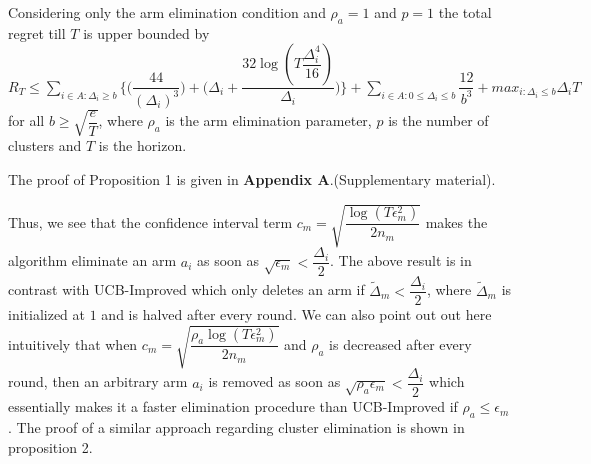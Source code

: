 


\begin{proposition}
\label{Result:Prop:1}
Considering only the arm elimination condition and $\rho_{a}=1$ and $p=1$ the total regret till $T$ is upper bounded by $R_{T}\leq \sum_{i\in A:\Delta_{i}\geq b}\bigg \lbrace \bigg(\dfrac{44}{(\Delta_{i})^{3}}\bigg) + \bigg(\Delta_{i}+\dfrac{32\log{(T\dfrac{\Delta_{i}^{4}}{16})}}{\Delta_{i}}\bigg)\bigg\rbrace + \sum_{i\in A:0\leq\Delta_{i}\leq b}\dfrac{12}{b^{3}} + max_{i:\Delta_{i}\leq b}\Delta_{i}T$ for all $b\geq\sqrt{\dfrac{e}{T}}$, where $\rho_{a}$ is the arm elimination parameter, $p$ is the number of clusters and $T$ is the horizon.
\end{proposition}

	The proof of Proposition 1 is given in \textbf{Appendix A}.(Supplementary material).

\begin{remark}
\label{Result:Rem:9}	
	Thus, we see that the confidence interval term $c_{m}=\sqrt{\dfrac{\log (T\epsilon_{m}^{2})}{2 n_{m}}}$ makes the algorithm eliminate an arm $a_{i}$ as soon as $\sqrt{\epsilon_{m}}<\dfrac{\Delta_{i}}{2}$. The above result is in contrast with UCB-Improved which only deletes an arm if $\tilde{\Delta}_{m}<\dfrac{\Delta_{i}}{2}$, where $\tilde{\Delta}_{m}$ is initialized at $1$ and is halved after every round. We can also point out out here intuitively that when $c_{m}=\sqrt{\dfrac{\rho_{a}\log (T\epsilon_{m}^{2})}{2 n_{m}}}$ and $\rho_{a}$ is decreased after every round, then an arbitrary arm $a_{i}$ is removed as soon as  $\sqrt{\rho_{a}\epsilon_{m}}<\dfrac{\Delta_{i}}{2}$ which essentially makes it a faster elimination procedure than UCB-Improved if $\rho_{a}\leq \epsilon_{m}$. The proof of a similar approach regarding cluster elimination is shown in proposition 2.
\end{remark}

